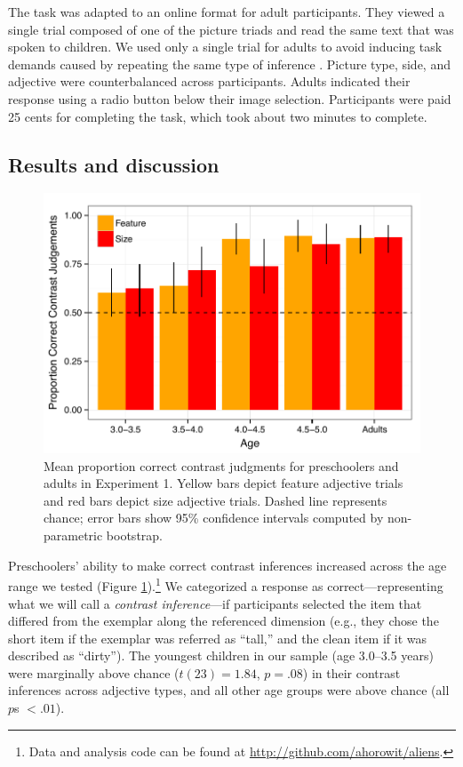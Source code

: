 \documentclass[man]{apa2}
\begin{document}
The task was adapted to an online format for adult participants. They viewed a single trial composed of one of the picture triads and read the same text that was spoken to children. We used only a single trial for adults to avoid inducing task demands caused by repeating the same type of inference \cite{frank2012}. Picture type, side, and adjective were counterbalanced across participants.  Adults indicated their response using a radio button below their image selection.  Participants were paid 25 cents for completing the task, which took about two minutes to complete. 

\subsection{Results and discussion}

\begin{figure}[t] 
  \begin{center} 
    \includegraphics[width=4.5in]{figures/expt1_mod.pdf} 
    \caption{\label{fig:expt1_kidsAdults} Mean proportion correct contrast judgments for preschoolers and adults in Experiment 1. Yellow bars depict feature adjective trials and red bars depict size adjective trials. Dashed line represents chance; error bars show 95\% confidence intervals computed by non-parametric bootstrap.}
  \end{center} 
  \vspace{-10ex} 
\end{figure}	

Preschoolers' ability to make correct contrast inferences increased across the age range we tested (Figure \ref{fig:expt1_kidsAdults}).\footnote{Data and analysis code can be found at \url{http://github.com/ahorowit/aliens}.} We categorized a response as correct---representing what we will call a \emph{contrast inference}---if participants selected the item that differed from the exemplar along the referenced dimension (e.g., they chose the short item if the exemplar was referred as ``tall,'' and the clean item if it was described as ``dirty'').  The youngest children in our sample (age 3.0--3.5 years) were marginally above chance ($t(23) = 1.84$, $p = .08$) in their contrast inferences across adjective types, and all other age groups were above chance (all $p$s $< .01$).
\end{document}
